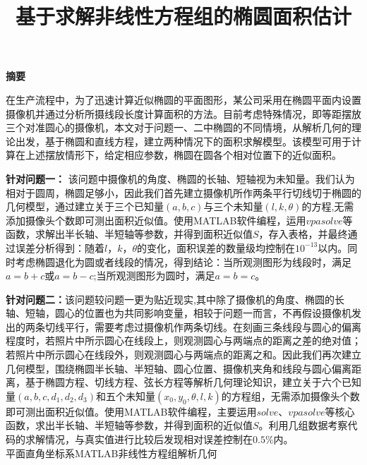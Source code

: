 \documentclass[a4paper,10.5pt]{ctexart}
\title{\textbf{基于求解非线性方程组的椭圆面积估计}}
\date{}
\begin{document}
	\maketitle
\begin{center}
\Large{\bf {摘\qquad 要}}
\end{center}


\par %
在生产流程中，为了迅速计算近似椭圆的平面图形，某公司采用在椭圆平面内设置摄像机并通过分析所摄线段长度计算面积的方法。目前考虑特殊情况，即等距摆放三个对准圆心的摄像机，本文对于问题一、二中椭圆的不同情境，从解析几何的理论出发，基于椭圆和直线方程，建立两种情况下的面积求解模型。该模型可用于计算在上述摆放情形下，给定相应参数，椭圆在圆各个相对位置下的近似面积。
\par \textbf{针对问题一：}%
该问题中摄像机的角度、椭圆的长轴、短轴视为未知量。我们认为相对于圆周，椭圆足够小，因此我们首先建立摄像机所作两条平行切线切于椭圆的几何模型，通过建立关于三个已知量$(a,b,c)$与三个未知量$(l,k,\theta)$的方程,无需添加摄像头个数即可测出面积近似值。使用MATLAB软件编程，运用$vpasolve$等函数，求解出半长轴、半短轴等参数，并得到面积近似值$S$，存入表格，并最终通过误差分析得到：随着$l$，$k$，$\theta$的变化，面积误差的数量级均控制在$10^{-13}$以内。同时考虑椭圆退化为圆或者线段的情况，得到结论：当所观测图形为线段时，满足$a=b+c$或$a=b-c$;当所观测图形为圆时，满足$a=b=c$。
\par \textbf{针对问题二：}该问题较问题一更为贴近现实,其中除了摄像机的角度、椭圆的长轴、短轴，圆心的位置也为共同影响变量，相较于问题一而言，不再假设摄像机发出的两条切线平行，需要考虑过摄像机作两条切线。在刻画三条线段与圆心的偏离程度时，若照片中所示圆心在线段上，则观测圆心与两端点的距离之差的绝对值；若照片中所示圆心在线段外，则观测圆心与两端点的距离之和。因此我们再次建立几何模型，围绕椭圆半长轴、半短轴、圆心位置、摄像机夹角和线段与圆心偏离距离，基于椭圆方程、切线方程、弦长方程等解析几何理论知识，建立关于六个已知量$(a,b,c,d_1,d_2,d_3)$和五个未知量$(x_0,y_0,\theta,l,k)$的方程组，无需添加摄像头个数即可测出面积近似值。使用MATLAB软件编程，主要运用$solve$、$vpasolve$等核心函数，求出半长轴、半短轴等参数，并得到面积的近似值$S$。利用几组数据考察代码的求解情况，与真实值进行比较后发现相对误差控制在$0.5\%$内。
\\
平面直角坐标系\quad MATLAB\quad 非线性方程组\quad 解析几何
\clearpage
\end{document}
